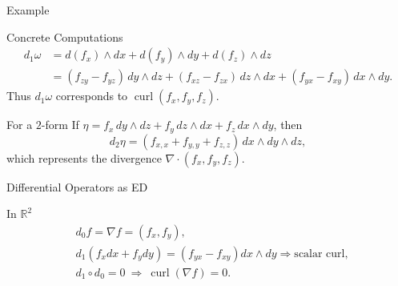 \begin{frame}{Example}
\begin{block}{Concrete Computations}
\[
\begin{aligned}
d_1\omega
&=d(f_x)\wedge dx+d(f_y)\wedge dy+d(f_z)\wedge dz\\[3pt]
&=(f_{zy}-f_{yz})\,dy\wedge dz+(f_{xz}-f_{zx})\,dz\wedge dx+(f_{yx}-f_{xy})\,dx\wedge dy.
\end{aligned}
\]
Thus \(d_1\omega\) corresponds to \(\operatorname{curl}(f_x,f_y,f_z)\).
\end{block}

\begin{block}{For a \(2\)-form}
If \(\eta=f_x\,dy\wedge dz+f_y\,dz\wedge dx+f_z\,dx\wedge dy\), then
\[
d_2\eta=(f_{x,x}+f_{y,y}+f_{z,z})\,dx\wedge dy\wedge dz,
\]
which represents the divergence \(\nabla\!\cdot\!(f_x,f_y,f_z)\).
\end{block}
\end{frame}


\begin{frame}{Differential Operators as ED}
\begin{block}{In \(\mathbb{R}^2\)}
\[
\begin{aligned}
&d_0f = \nabla f=(f_x,f_y),\\[3pt]
&d_1(f_xdx+f_ydy) = (f_{yx}-f_{xy})dx\wedge dy \Rightarrow \text{scalar curl},\\[3pt]
&d_1\circ d_0=0\ \Rightarrow\ \operatorname{curl}(\nabla f)=0.
\end{aligned}
\]
\end{block}
\begin{center}
\end{center}
\end{frame}

